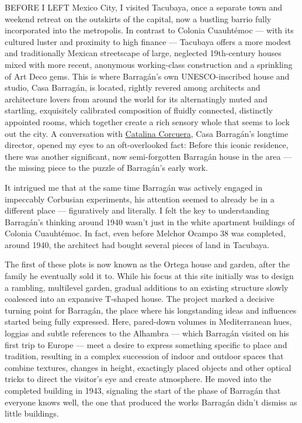 BEFORE I LEFT Mexico City, I visited Tacubaya, once a separate town and
weekend retreat on the outskirts of the capital, now a bustling barrio
fully incorporated into the metropolis. In contrast to Colonia
Cuauhtémoc --- with its cultured luster and proximity to high finance
--- Tacubaya offers a more modest and traditionally Mexican streetscape
of large, neglected 19th-century houses mixed with more recent,
anonymous working-class construction and a sprinkling of Art Deco gems.
This is where Barragán's own UNESCO-inscribed house and studio, Casa
Barragán, is located, rightly revered among architects and architecture
lovers from around the world for its alternatingly muted and startling,
exquisitely calibrated composition of fluidly connected, distinctly
appointed rooms, which together create a rich sensory whole that seems
to lock out the city. A conversation with
\href{https://www.nytimes.com/2002/12/05/garden/in-mexico-city-a-quiet-revelation.html}{Catalina
Corcuera}, Casa Barragán's longtime director, opened my eyes to an
oft-overlooked fact: Before this iconic residence, there was another
significant, now semi-forgotten Barragán house in the area --- the
missing piece to the puzzle of Barragán's early work.

It intrigued me that at the same time Barragán was actively engaged in
impeccably Corbusian experiments, his attention seemed to already be in
a different place --- figuratively and literally. I felt the key to
understanding Barragán's thinking around 1940 wasn't just in the white
apartment buildings of Colonia Cuauhtémoc. In fact, even before Melchor
Ocampo 38 was completed, around 1940, the architect had bought several
pieces of land in Tacubaya.

The first of these plots is now known as the Ortega house and garden,
after the family he eventually sold it to. While his focus at this site
initially was to design a rambling, multilevel garden, gradual additions
to an existing structure slowly coalesced into an expansive T-shaped
house. The project marked a decisive turning point for Barragán, the
place where his longstanding ideas and influences started being fully
expressed. Here, pared-down volumes in Mediterranean hues, loggias and
subtle references to the Alhambra --- which Barragán visited on his
first trip to Europe --- meet a desire to express something specific to
place and tradition, resulting in a complex succession of indoor and
outdoor spaces that combine textures, changes in height, exactingly
placed objects and other optical tricks to direct the visitor's eye and
create atmosphere. He moved into the completed building in 1943,
signaling the start of the phase of Barragán that everyone knows well,
the one that produced the works Barragán didn't dismiss as little
buildings.

